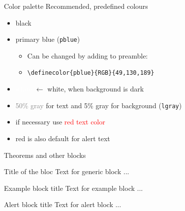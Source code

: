\documentclass[10pt,t]{beamer}
\begin{document}


\begin{frame}{Color palette}\label{colorpalette}
Recommended, predefined colours
\begin{itemize}
	\item black
	\item \textcolor{pblue}{primary blue} (\texttt{pblue})
	\begin{itemize}
	    \item Can be changed by adding to preamble:
	    \item[ ] \texttt{\textbackslash definecolor\{pblue\}\{RGB\}\{49,130,189\}}
	\end{itemize}
	\item \textcolor{white}{white} $\leftarrow$ white, when background is dark
	\item \textcolor{gray}{50\% gray } for text and \textcolor{lgray}{5\% gray} for background (\texttt{lgray})

	\vspace{5mm}
	\item if necessary use \textcolor{red}{red text color}  
	\item red is also default for \alert{alert text}
\end{itemize}
\end{frame} 



\begin{frame}{Theorems and other blocks}
	\begin{block}{Title of the bloc}
	Text for generic block ...
	\end{block}

\vspace{11pt}
	\begin{exampleblock}{Example block title}
	Text for example block ...
	\end{exampleblock}

\vspace{11pt}
	\begin{alertblock}{Alert block title}
	Text for alert block ...
	\end{alertblock}
\end{frame}
\end{document}
